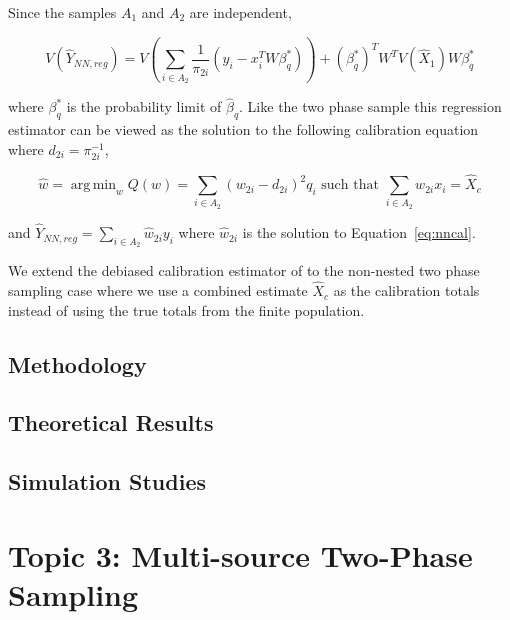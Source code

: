\documentclass[12pt]{article}
\DeclareMathOperator*{\argmin}{arg\,min}
\begin{document}
Since the samples $A_1$ and $A_2$ are independent, 

$$V(\hat Y_{NN, reg}) = V\left(\sum_{i \in A_2} \frac{1}{\pi_{2i}}(y_i -
x_i^TW\beta^*_q)\right) + (\beta^*_q)^T W^T V(\hat X_1) W \beta_q^*$$

where $\beta_q^*$ is the probability limit of $\hat \beta_q$. Like the two phase
sample this regression estimator can be viewed as the solution to the following
calibration equation where $d_{2i} = \pi_{2i}^{-1}$,

\begin{equation}\label{eq:nncal}
\hat w = \argmin_w Q(w) = \sum_{i \in A_2} (w_{2i} - d_{2i})^2 q_i \text{ such
that } \sum_{i \in A_2} w_{2i} x_i = \hat X_c
\end{equation}

and $\hat Y_{NN, reg} = \sum_{i \in A_2} \hat w_{2i} y_i$ where $\hat
w_{2i}$ is the solution to Equation~\ref{eq:nncal}.

We extend the debiased calibration estimator of \cite{kwon2024debiased} to the
non-nested two phase sampling case where we use a combined estimate $\hat X_c$
as the calibration totals instead of using the true totals from the finite
population.

\subsection{Methodology}

\subsection{Theoretical Results}

\subsection{Simulation Studies}

\section{Topic 3: Multi-source Two-Phase Sampling}




\end{document}
